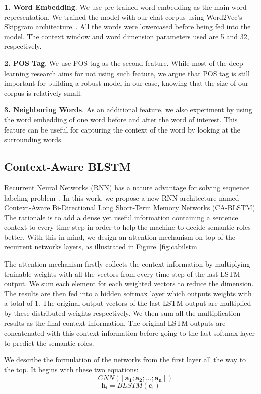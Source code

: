 \textbf{1. Word Embedding}. We use pre-trained word embedding as the main word representation. We trained the model with our chat corpus using Word2Vec's Skipgram architecture~\cite{mikolov2013distributed}. All the words were lowercased before being fed into the model. The context window and word dimension parameters used are 5 and 32, respectively.

\textbf{2. POS Tag}. We use POS tag as the second feature. While most of the deep learning research aims for not using such feature, we argue that POS tag is still important for building a robust model in our case, knowing that the size of our corpus is relatively small.

\textbf{3. Neighboring Words}. As an additional feature, we also experiment by using the word embedding of one word before and after the word of interest. This feature can be useful for capturing the context of the word by looking at the surrounding words.

\subsection{Context-Aware BLSTM}
Recurrent Neural Networks (RNN) has a nature advantage for solving sequence labeling problem~\cite{zhou2015end}. In this work, we propose a new RNN architecture named Context-Aware Bi-Directional Long Short-Term Memory Networks (CA-BLSTM). The rationale is to add a dense yet useful information containing a sentence context to every time step in order to help the machine to decide semantic roles better. With this in mind, we design an attention mechanism on top of the recurrent networks layers, as illustrated in Figure~\ref{fig:cabilstm} 

The attention mechanism firstly collects the context information by multiplying trainable weights with all the vectors from every time step of the last LSTM output. We sum each element for each weighted vectors to reduce the dimension. The results are then fed into a hidden softmax layer which outputs weights with a total of 1. The original output vectors of the last LSTM output are multiplied by these distributed weights respectively. We then sum all the multiplication results as the final context information. The original LSTM outputs are concatenated with this context information before going to the last softmax layer to predict the semantic roles. 

We describe the formulation of the networks from the first layer all the way to the top. It begins with these two equations:
\begin{equation}
[\mathbf{c_{1}}; \mathbf{c_{2}}; ...; \mathbf{c_{n}}] = CNN([\mathbf{a_{1}}; \mathbf{a_{2}}; ...; \mathbf{a_{n}}])
\end{equation}
\begin{equation}
\mathbf{h_{i}} = BLSTM(\mathbf{c_{i}})
\end{equation}

